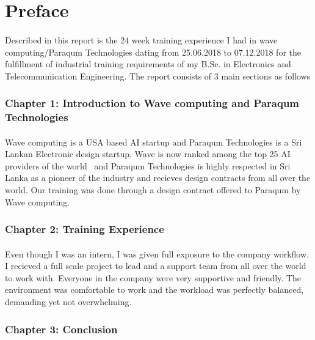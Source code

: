 \section*{Preface}

\paragraph{}
Described in this report is the 24 week training experience I had in wave computing/Paraqum Technologies dating from 25.06.2018 to 07.12.2018 for the fulfillment of industrial training requirements of my B.Sc. in Electronics and Telecommunication Engineering. The report consists of 3 main sections as follows

\subsubsection*{Chapter 1: Introduction to Wave computing and Paraqum Technologies}
\paragraph{}
Wave computing is a USA based AI startup and Paraqum Technologies is a Sri Lankan Electronic design startup. Wave is now ranked among the top 25 AI providers of the world~\cite{top25ai} and Paraqum Technologies is highly respected in Sri Lanka as a pioneer of the industry and recieves design contracts from all over the world. Our training was done through a design contract offered to Paraqum by Wave computing.

\subsubsection*{Chapter 2: Training Experience}
\paragraph{}
Even though I was an intern, I was given full exposure to the company workflow. I recieved a full scale project to lead and a support team from all over the world to work with. Everyone in the company were very supportive and friendly. The environment was comfortable to work and the workload was perfectly balanced, demanding yet not overwhelming.

\subsubsection*{Chapter 3: Conclusion}
